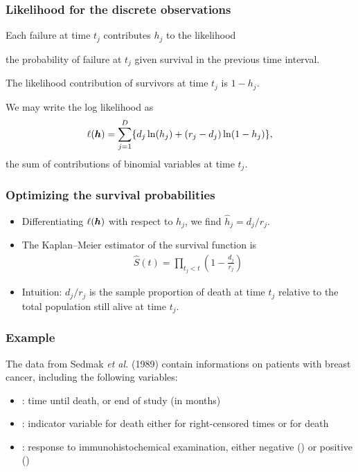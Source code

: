 \documentclass{beamer}
\begin{document}
\begin{frame}
\frametitle{Likelihood for the discrete observations}
\bi \item Each failure at time $t_j$ contributes $h_j$ to the likelihood
\bi \item the probability of failure at $t_j$ given survival in the previous time interval. \ei 
\item 
The likelihood contribution of survivors at time $t_j$ is $1-h_j$.
\item 
We may write the log likelihood as
\begin{align*}
 \ell(\boldsymbol {h}) = \sum_{j=1}^D \{ d_j \ln(h_j) + (r_j-d_j)\ln(1-h_j)\},
\end{align*}
the sum of contributions of binomial variables at time $t_j$.
\ei
\end{frame}
\begin{frame}
\frametitle{Optimizing the survival probabilities}
\begin{itemize}
\item Differentiating $\ell(\boldsymbol {h})$ with respect to  $h_j$, we find $\widehat{h}_j = d_j/r_j$.
\item The Kaplan--Meier estimator of the survival function is
\begin{align*}
\widehat{S}(t) = \prod_{t_j < t} \left( 1 - \frac{d_j}{r_j} \right)                                                                      \end{align*}
\item 
Intuition: $d_j/r_j$ is the sample proportion of death at time $t_j$ relative to the total population still alive at time $t_j$.
\end{itemize}
\end{frame}

\begin{frame}
\frametitle{Example}
The  data from Sedmak \textsl{et al.} (1989) contain informations on patients with breast cancer, including the following variables:
\begin{itemize}
 
\item {}: time until death, or end of study  (in months)
\item {}: indicator variable for death either  for right-censored times or  for death
\item {}: response to immunohistochemical examination, either negative () or positive ()
\end{itemize}
%    
% 
\end{frame}
\end{document}
